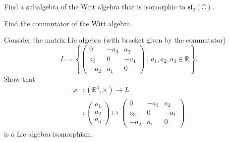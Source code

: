 \documentclass[12 pt, letterpaper]{hmcpset}
\begin{document}
\begin{problem}[1.]
	Find a subalgebra of the Witt algebra that is isomorphic to $\mathfrak{sl}_{2}(\mathbb{C})$.
\end{problem}

\pagebreak

\begin{problem}[2.]
	Find the commutator of the Witt algebra.
\end{problem}

\pagebreak

\begin{problem}[3.]
	Consider the matrix Lie algebra (with bracket given by the commutator)
	\[
		L = \left \{ \begin{pmatrix}
				0 & -a_{3} & a_{2} \\
				a_{3} & 0 & -a_{1} \\
				-a_{2} & a_{1} & 0
		\end{pmatrix} \mid a_{1}, a_{2}, a_{3} \in \mathbb{R} \right \}.
	\]
	Show that
	\begin{align*}
		\varphi & : (\mathbb{R}^{3}, \times) \to L \\
			& : \begin{pmatrix}
				a_{1} \\
				a_{2} \\
				a_{3}
			\end{pmatrix} \mapsto \begin{pmatrix}
				0 & -a_{3} & a_{2} \\
				a_{3} & 0 & -a_{1} \\
				-a_{2} & a_{1} & 0
		\end{pmatrix}
	\end{align*}
	is a Lie algebra isomorphism.
\end{problem}
\end{document}
